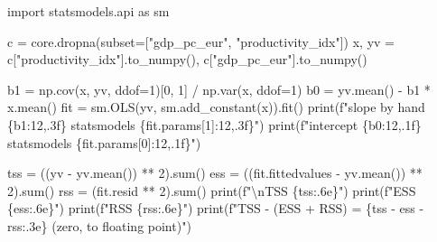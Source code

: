 \documentclass[
  letterpaper,
  10pt,
  twoside,
  openright,
  numbers=noenddot,
  chapterprefix=true]{scrbook}
\newenvironment{Shaded}{}{}
\newcommand{\BuiltInTok}[1]{\textcolor[rgb]{0.84,0.23,0.29}{#1}}
\newcommand{\CharTok}[1]{\textcolor[rgb]{0.01,0.18,0.38}{#1}}
\newcommand{\DecValTok}[1]{\textcolor[rgb]{0.00,0.36,0.77}{#1}}
\newcommand{\ImportTok}[1]{\textcolor[rgb]{0.01,0.18,0.38}{#1}}
\newcommand{\NormalTok}[1]{\textcolor[rgb]{0.14,0.16,0.18}{#1}}
\newcommand{\OperatorTok}[1]{\textcolor[rgb]{0.14,0.16,0.18}{#1}}
\newcommand{\SpecialCharTok}[1]{\textcolor[rgb]{0.00,0.36,0.77}{#1}}
\newcommand{\SpecialStringTok}[1]{\textcolor[rgb]{0.01,0.18,0.38}{#1}}
\newcommand{\StringTok}[1]{\textcolor[rgb]{0.01,0.18,0.38}{#1}}
\begin{document}
\label{check-triangle}
\begin{Shaded}
\begin{Highlighting}[]
\ImportTok{import}\NormalTok{ statsmodels.api }\ImportTok{as}\NormalTok{ sm}

\NormalTok{c }\OperatorTok{=}\NormalTok{ core.dropna(subset}\OperatorTok{=}\NormalTok{[}\StringTok{"gdp\_pc\_eur"}\NormalTok{, }\StringTok{"productivity\_idx"}\NormalTok{])}
\NormalTok{x, yv }\OperatorTok{=}\NormalTok{ c[}\StringTok{"productivity\_idx"}\NormalTok{].to\_numpy(), c[}\StringTok{"gdp\_pc\_eur"}\NormalTok{].to\_numpy()}

\NormalTok{b1 }\OperatorTok{=}\NormalTok{ np.cov(x, yv, ddof}\OperatorTok{=}\DecValTok{1}\NormalTok{)[}\DecValTok{0}\NormalTok{, }\DecValTok{1}\NormalTok{] }\OperatorTok{/}\NormalTok{ np.var(x, ddof}\OperatorTok{=}\DecValTok{1}\NormalTok{)}
\NormalTok{b0 }\OperatorTok{=}\NormalTok{ yv.mean() }\OperatorTok{{-}}\NormalTok{ b1 }\OperatorTok{*}\NormalTok{ x.mean()}
\NormalTok{fit }\OperatorTok{=}\NormalTok{ sm.OLS(yv, sm.add\_constant(x)).fit()}
\BuiltInTok{print}\NormalTok{(}\SpecialStringTok{f"slope by hand }\SpecialCharTok{\{}\NormalTok{b1}\SpecialCharTok{:12,.3f\}}\SpecialStringTok{   statsmodels }\SpecialCharTok{\{}\NormalTok{fit}\SpecialCharTok{.}\NormalTok{params[}\DecValTok{1}\NormalTok{]}\SpecialCharTok{:12,.3f\}}\SpecialStringTok{"}\NormalTok{)}
\BuiltInTok{print}\NormalTok{(}\SpecialStringTok{f"intercept     }\SpecialCharTok{\{}\NormalTok{b0}\SpecialCharTok{:12,.1f\}}\SpecialStringTok{   statsmodels }\SpecialCharTok{\{}\NormalTok{fit}\SpecialCharTok{.}\NormalTok{params[}\DecValTok{0}\NormalTok{]}\SpecialCharTok{:12,.1f\}}\SpecialStringTok{"}\NormalTok{)}

\NormalTok{tss }\OperatorTok{=}\NormalTok{ ((yv }\OperatorTok{{-}}\NormalTok{ yv.mean()) }\OperatorTok{**} \DecValTok{2}\NormalTok{).}\BuiltInTok{sum}\NormalTok{()}
\NormalTok{ess }\OperatorTok{=}\NormalTok{ ((fit.fittedvalues }\OperatorTok{{-}}\NormalTok{ yv.mean()) }\OperatorTok{**} \DecValTok{2}\NormalTok{).}\BuiltInTok{sum}\NormalTok{()}
\NormalTok{rss }\OperatorTok{=}\NormalTok{ (fit.resid }\OperatorTok{**} \DecValTok{2}\NormalTok{).}\BuiltInTok{sum}\NormalTok{()}
\BuiltInTok{print}\NormalTok{(}\SpecialStringTok{f"}\CharTok{\textbackslash{}n}\SpecialStringTok{TSS }\SpecialCharTok{\{}\NormalTok{tss}\SpecialCharTok{:.6e\}}\SpecialStringTok{"}\NormalTok{)}
\BuiltInTok{print}\NormalTok{(}\SpecialStringTok{f"ESS }\SpecialCharTok{\{}\NormalTok{ess}\SpecialCharTok{:.6e\}}\SpecialStringTok{"}\NormalTok{)}
\BuiltInTok{print}\NormalTok{(}\SpecialStringTok{f"RSS }\SpecialCharTok{\{}\NormalTok{rss}\SpecialCharTok{:.6e\}}\SpecialStringTok{"}\NormalTok{)}
\BuiltInTok{print}\NormalTok{(}\SpecialStringTok{f"TSS {-} (ESS + RSS) = }\SpecialCharTok{\{}\NormalTok{tss }\OperatorTok{{-}}\NormalTok{ ess }\OperatorTok{{-}}\NormalTok{ rss}\SpecialCharTok{:.3e\}}\SpecialStringTok{   (zero, to floating point)"}\NormalTok{)}


\end{Highlighting}
\end{Shaded}
\end{document}
